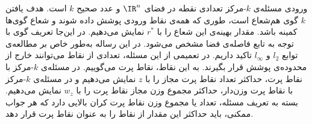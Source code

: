 
ورودی مسئله‌ی $k$-مرکز تعدادی نقطه در فضای $\IR^n$ و عدد صحیح $k$ است. هدف یافتن $k$ گوی هم‌شعاع است، طوری که همه‌ی نقاط ورودی پوشش داده شوند و شعاع گوی‌ها کمینه باشد. مقدار بهینه‌ی این شعاع را با $r^*$ نمایش می‌دهیم. در این‌جا تعریف گوی با توجه به تابع فاصله‌ی فضا مشخص می‌شود. در این رساله به‌طور خاص بر مطالعه‌ی توابع $l_2$ و $l_\infty$ تاکید داریم. در تعمیمی از این مسئله، تعدادی از نقاط می‌توانند خارج از محدوده‌ی پوشش قرار بگیرند. به این نقاط، نقاط پرت می‌گوییم. در مسئله‌ی $k$-مرکز با نقاط پرت، حداکثر تعداد نقاط پرت مجاز را با $z$ نمایش می‌دهیم و در مسئله‌ی $k$-مرکز با نقاط پرت وزن‌دار، حداکثر مجموع وزن مجاز نقاط پرت را با $w_z$ نمایش می‌دهیم. بسته به تعریف مسئله، تعداد یا مجموع وزن نقاط پرت کران بالایی دارد که هر جواب ممکنی، باید حداکثر این مقدار از نقاط را به عنوان نقاط پرت قرار دهد.


